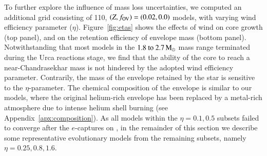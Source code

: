 \documentclass[main.tex]{subfiles}
\begin{document}
To further explore the influence of mass loss uncertainties, we computed an additional grid consisting of 110,  $(Z, f_{\rm OV})=(0.02,0.0)$ models, with varying wind efficiency parameter ($\eta$). 
Figure~\ref{fig:etas} shows the effects of wind on core growth (top panel), and on the retention efficiency of envelope mass (bottom panel). Notwithstanding that most models in the  $\numrange{1.8}{2.7}\msun$ mass range terminated during the Urca reactions stage, we find that the ability of the core to reach a near-Chandrasekhar mass is not hindered by the adopted wind efficiency parameter. Contrarily, the mass of the envelope retained by the star is sensitive to the  $\eta$-parameter. The chemical composition of the envelope is similar to our \seriesone models, where the original helium-rich envelope has been replaced by a metal-rich atmosphere due to intense helium shell burning (see Appendix~\ref{apx:composition}). As all models within the $\eta = 0.1, 0.5$ subsets failed to converge after the $e$-captures on , in the remainder of this section we describe some representative evolutionary models from the remaining subsets, namely $\eta = 0.25, 0.8, 1.6$.
\end{document}
